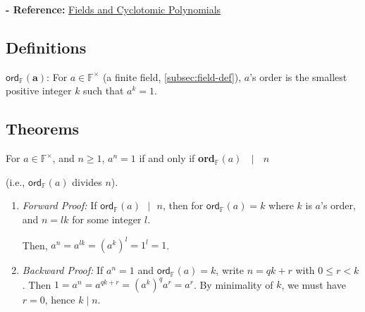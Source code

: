 \textbf{- Reference:} 
\href{https://e.math.cornell.edu/people/belk/numbertheory/CyclotomicPolynomials.pdf}{Fields and Cyclotomic Polynomials}~\cite{cyclotomic-polynomial}

\subsection{Definitions}
\label{subsec:order-def}

\begin{tcolorbox}[title={\textbf{\tboxdef{\ref*{subsec:order-def}} Order Definition}}]
$\bm{\textsf{ord}_{\mathbb{F}}(a)}$: For $a \in \mathbb{F}^{\times}$ (a finite field, \autoref{subsec:field-def}), $a$'s order is the smallest positive integer $k$ such that $a^k = 1$. 
\end{tcolorbox}

\subsection{Theorems}
\label{subsec:order-theorem}



\begin{tcolorbox}[title={\textbf{\tboxtheorem{\ref*{subsec:order-theorem}.1} Order Property (I)}}]
For $a \in \mathbb{F}^{\times}$, and $n \geq 1$, $a^n = 1$ if and only if \textbf{\textsf{ord}}$_{\mathbb{F}}(a) \text{ } \mid \text{ } n$

(i.e., $\textsf{ord}_{\mathbb{F}}(a)$ divides $n$).
\end{tcolorbox}

\begin{myproof}
    \begin{enumerate}
    \item \textit{Forward Proof:} If $\textsf{ord}_{\mathbb{F}}(a) \text{ } | \text{ } n$, then for $\textsf{ord}_{\mathbb{F}}(a) = k$ where $k$ is $a$'s order, and $n = lk$ for some integer $l$. 
    
    Then, $a^n = a^{lk} = (a^k)^l = 1^l = 1$.
    \item \textit{Backward Proof:} If $a^n = 1$ and $\textsf{ord}_{\mathbb{F}}(a)=k$, write $n=qk+r$ with $0 \le r < k$. Then $1=a^n=a^{qk+r}=(a^k)^q a^r=a^r$. By minimality of $k$, we must have $r=0$, hence $k \mid n$.
    \end{enumerate}
\end{myproof}


